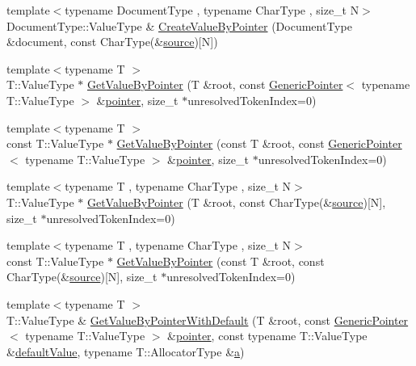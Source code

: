 \begin{DoxyCompactItemize}
\item 
{\footnotesize template$<$typename Document\+Type , typename Char\+Type , size\+\_\+t N$>$ }\\Document\+Type\+::\+Value\+Type \& \mbox{\hyperlink{namespacerapidjson_a7bebd7d041eb5f91245401c674bc1776}{Create\+Value\+By\+Pointer}} (Document\+Type \&document, const Char\+Type(\&\mbox{\hyperlink{namespacerapidjson_a37a3d95ab06aa7542487bb76e704885c}{source}})\mbox{[}N\mbox{]})
\item 
{\footnotesize template$<$typename T $>$ }\\T\+::\+Value\+Type $\ast$ \mbox{\hyperlink{namespacerapidjson_a1e54debf2cebf89b4e810cb9a22bfa3b}{Get\+Value\+By\+Pointer}} (T \&root, const \mbox{\hyperlink{classrapidjson_1_1_generic_pointer}{Generic\+Pointer}}$<$ typename T\+::\+Value\+Type $>$ \&\mbox{\hyperlink{namespacerapidjson_aa5b8c07c8721afe6870a0210820ea19d}{pointer}}, size\+\_\+t $\ast$unresolved\+Token\+Index=0)
\item 
{\footnotesize template$<$typename T $>$ }\\const T\+::\+Value\+Type $\ast$ \mbox{\hyperlink{namespacerapidjson_a6ca286bdc96a69351dcaaa55dea8c03a}{Get\+Value\+By\+Pointer}} (const T \&root, const \mbox{\hyperlink{classrapidjson_1_1_generic_pointer}{Generic\+Pointer}}$<$ typename T\+::\+Value\+Type $>$ \&\mbox{\hyperlink{namespacerapidjson_aa5b8c07c8721afe6870a0210820ea19d}{pointer}}, size\+\_\+t $\ast$unresolved\+Token\+Index=0)
\item 
{\footnotesize template$<$typename T , typename Char\+Type , size\+\_\+t N$>$ }\\T\+::\+Value\+Type $\ast$ \mbox{\hyperlink{namespacerapidjson_a24060eafc78078b03c2db84fef65b5dd}{Get\+Value\+By\+Pointer}} (T \&root, const Char\+Type(\&\mbox{\hyperlink{namespacerapidjson_a37a3d95ab06aa7542487bb76e704885c}{source}})\mbox{[}N\mbox{]}, size\+\_\+t $\ast$unresolved\+Token\+Index=0)
\item 
{\footnotesize template$<$typename T , typename Char\+Type , size\+\_\+t N$>$ }\\const T\+::\+Value\+Type $\ast$ \mbox{\hyperlink{namespacerapidjson_acca88ad99e931abf827f11d324174e9a}{Get\+Value\+By\+Pointer}} (const T \&root, const Char\+Type(\&\mbox{\hyperlink{namespacerapidjson_a37a3d95ab06aa7542487bb76e704885c}{source}})\mbox{[}N\mbox{]}, size\+\_\+t $\ast$unresolved\+Token\+Index=0)
\item 
{\footnotesize template$<$typename T $>$ }\\T\+::\+Value\+Type \& \mbox{\hyperlink{namespacerapidjson_aa33a1f9cd33ac3f6f2af3f90028fee6e}{Get\+Value\+By\+Pointer\+With\+Default}} (T \&root, const \mbox{\hyperlink{classrapidjson_1_1_generic_pointer}{Generic\+Pointer}}$<$ typename T\+::\+Value\+Type $>$ \&\mbox{\hyperlink{namespacerapidjson_aa5b8c07c8721afe6870a0210820ea19d}{pointer}}, const typename T\+::\+Value\+Type \&\mbox{\hyperlink{namespacerapidjson_a1591a36fec4c563e57394458a2fc508d}{default\+Value}}, typename T\+::\+Allocator\+Type \&\mbox{\hyperlink{namespacerapidjson_a11fce64e721729aaf6be4a485c78f231}{a}})

\end{DoxyCompactItemize}
